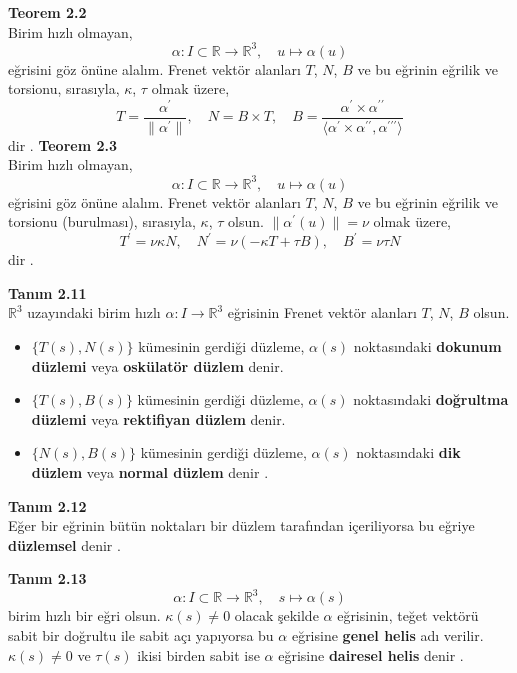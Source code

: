 \documentclass[a4paper,12pt]{article}
\begin{document}
\textbf{Teorem 2.2} \\
Birim hızlı olmayan,
\[
\alpha: I \subset \mathbb{R} \to \mathbb{R}^3, \quad u \mapsto \alpha(u)
\]
eğrisini göz önüne alalım. Frenet vektör alanları $T$, $N$, $B$ ve bu eğrinin eğrilik ve torsionu, sırasıyla, $\kappa$, $\tau$ olmak üzere,
\[
T = \frac{\alpha^\prime}{\|\alpha^\prime\|}, \quad
N = B \times T, \quad
B = \frac{\alpha^\prime \times \alpha^{\prime\prime}}{\langle \alpha^\prime \times \alpha^{\prime\prime}, \alpha^{\prime\prime\prime} \rangle}
\]
dir \cite{ref}.
\textbf{Teorem 2.3} \\ 
Birim hızlı olmayan,
\[
\alpha: I \subset \mathbb{R} \to \mathbb{R}^3, \quad u \mapsto \alpha(u)
\]
eğrisini göz önüne alalım. Frenet vektör alanları $T$, $N$, $B$ ve bu eğrinin eğrilik ve torsionu (burulması), sırasıyla, $\kappa$, $\tau$ olsun. $\|\alpha^\prime(u)\| = \nu$ olmak üzere,
\[
T^\prime = \nu \kappa N, \quad
N^\prime = \nu(-\kappa T + \tau B), \quad
B^\prime = \nu \tau N
\]
dir \cite{ref}.

\textbf{Tanım 2.11} \\
$\mathbb{R}^3$ uzayındaki birim hızlı $\alpha: I \to \mathbb{R}^3$ eğrisinin Frenet vektör alanları $T$, $N$, $B$ olsun.
\begin{itemize}
    \item $\{T(s), N(s)\}$ kümesinin gerdiği düzleme, $\alpha(s)$ noktasındaki \textbf{dokunum düzlemi} veya \textbf{oskülatör düzlem} denir.
    \item $\{T(s), B(s)\}$ kümesinin gerdiği düzleme, $\alpha(s)$ noktasındaki \textbf{doğrultma düzlemi} veya \textbf{rektifiyan düzlem} denir.
    \item $\{N(s), B(s)\}$ kümesinin gerdiği düzleme, $\alpha(s)$ noktasındaki \textbf{dik düzlem} veya \textbf{normal düzlem} denir \cite{ref}.
\end{itemize}

\textbf{Tanım 2.12} \\
Eğer bir eğrinin bütün noktaları bir düzlem tarafından içeriliyorsa bu eğriye \textbf{düzlemsel} denir \cite{ref2}.

\textbf{Tanım 2.13} \\
\[
\alpha: I \subset \mathbb{R} \to \mathbb{R}^3, \quad s \mapsto \alpha(s)
\]
birim hızlı bir eğri olsun. $\kappa(s) \neq 0$ olacak şekilde $\alpha$ eğrisinin, teğet vektörü sabit bir doğrultu ile sabit açı yapıyorsa bu $\alpha$ eğrisine \textbf{genel helis} adı verilir. $\kappa(s) \neq 0$ ve $\tau(s)$ ikisi birden sabit ise $\alpha$ eğrisine \textbf{dairesel helis} denir \cite{ref3}.
\end{document}

